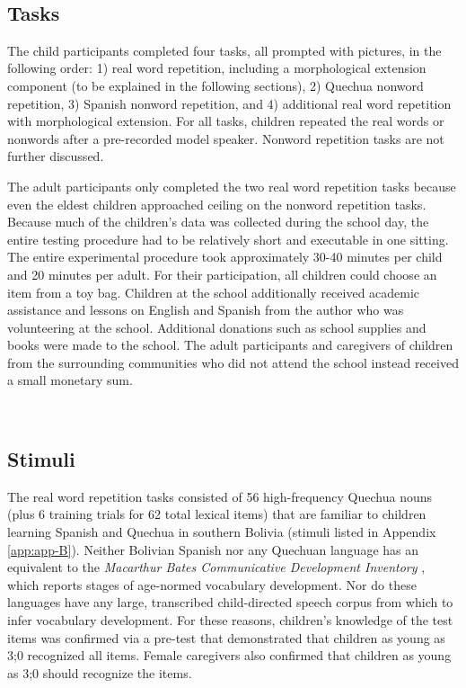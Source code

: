 \documentclass[a4paper,man,floatsintext,natbib,donotrepeattitle, apacite]{apa6}
\begin{document}
~
~

 \subsection{Tasks}

The child participants completed four tasks, all prompted with pictures, in the following order: 1) real word repetition, including a morphological extension component (to be explained in the following sections), 2) Quechua nonword repetition, 3) Spanish nonword repetition, and 4) additional real word repetition with morphological extension. For all tasks, children repeated the real words or nonwords after a pre-recorded model speaker. Nonword repetition tasks are not further discussed. 

The adult participants only completed the two real word repetition tasks because even the eldest children approached ceiling on the nonword repetition tasks. Because much of the children's data was collected during the school day, the entire testing procedure had to be relatively short and executable in one sitting. The entire experimental procedure took approximately 30-40 minutes per child and 20 minutes per adult. For their participation, all children could choose an item from a toy bag. Children at the school additionally received academic assistance and lessons on English and Spanish from the author who was volunteering at the school. Additional donations such as school supplies and books were made to the school. The adult participants and caregivers of children from the surrounding communities who did not attend the school instead received a small monetary sum.


~
~

\subsection{Stimuli}\label{ch3-stimuli}

The real word repetition tasks consisted of 56 high-frequency Quechua nouns (plus 6 training trials for 62 total lexical items) that are familiar to children learning Spanish and Quechua in southern Bolivia (stimuli listed in Appendix \ref{app:app-B}). Neither Bolivian Spanish nor any Quechuan language has an equivalent to the \textit{Macarthur Bates Communicative Development Inventory} \citep{fensonMacArthurBatesCommunicativeDevelopment2007}, which reports stages of age-normed vocabulary development. Nor do these languages have any large, transcribed child-directed speech corpus from which to infer vocabulary development. For these reasons, children’s knowledge of the test items was confirmed via a pre-test that demonstrated that children as young as 3;0 recognized all items. Female caregivers also confirmed that children as young as 3;0 should recognize the items. 
\end{document}
